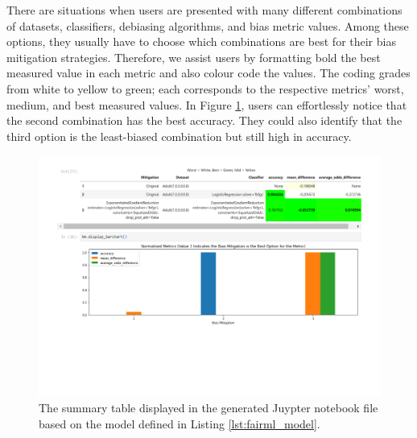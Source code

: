 \documentclass[sigconf,review]{acmart}
\begin{document}
{	There are situations when users are presented with many different combinations of datasets, classifiers, debiasing algorithms, and bias metric values. Among these options, they usually have to choose which combinations are best for their bias mitigation strategies. Therefore, we assist users by formatting bold the best measured value in each metric and also colour code the values. The coding grades from white to yellow to green; each corresponds to the respective metrics' worst, medium, and best measured values. In Figure \ref{fig:table-output}, users can effortlessly notice that the second combination has the best accuracy. They could also identify that the third option is the least-biased combination but still high in accuracy.
		
	\begin{figure}
		\includegraphics[width=\linewidth]{figures/table-output}
		\caption{The summary table displayed in the generated Juypter notebook file based on the model defined in Listing \ref{lst:fairml_model}.}
		\label{fig:table-output}
	\end{figure}
	
}
\end{document}
